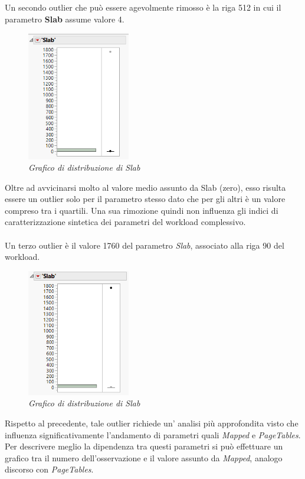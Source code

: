 \\
\vspace{0.5cm}
\\
Un secondo outlier che può essere agevolmente rimosso è la riga 512 in cui il parametro \textbf{Slab} assume valore 4. 
\begin{figure}[H]
	\centering
	\includegraphics[width=0.4\textwidth]{img/hw1/outlier_slab1.png}
	\caption{\textit{Grafico di distribuzione di Slab}}
\end{figure}
Oltre ad avvicinarsi molto al valore medio assunto da Slab (zero), esso risulta essere un outlier solo per il parametro stesso dato che per gli altri è un valore compreso tra i quartili. Una sua rimozione quindi non influenza gli indici di caratterizzazione sintetica dei parametri del workload complessivo.
\\
\vspace{0.5cm}
\\
Un terzo outlier è il valore 1760 del parametro \textit{Slab}, associato alla riga 90 del workload.
\begin{figure}[H]
	\centering
	\includegraphics[width=0.4\textwidth]{img/hw1/outlier_slab2.png}
	\caption{\textit{Grafico di distribuzione di Slab}}
\end{figure}
Rispetto al precedente, tale outlier richiede un' analisi più approfondita visto che influenza significativamente l'andamento di parametri quali \textit{Mapped} e \textit{PageTables}. Per descrivere meglio la dipendenza tra questi parametri si può effettuare un grafico tra il numero dell'osservazione e il valore assunto da \textit{Mapped}, analogo discorso con \textit{PageTables}.	
